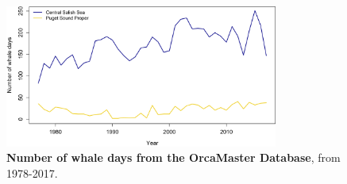 \documentclass{article}
\begin{document}
\begin{figure}[!hp]
\includegraphics[width=0.8\textwidth]{../analyses/figures/OrcaPhenPlots/whaledays_assumeSRKW2regs.png} 
\caption{\textbf{Number of whale days from the OrcaMaster Database}, from 1978-2017. }
\label{fig:wdays}
\end{figure}
\end{document}
